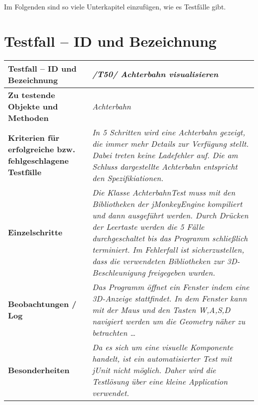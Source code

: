 Im Folgenden sind so viele Unterkapitel einzufügen, wie es Testfälle gibt.\\

\section{Testfall -- ID und Bezeichnung}


\begin{longtable}{|p{7cm}|p{10cm}|}
\hline
\textbf{Testfall -- ID und Bezeichnung} &  \textit{/T50/ Achterbahn visualisieren} \\
\hline
\textbf{Zu testende Objekte und Methoden} &  \textit{Achterbahn}
\\
\hline
\textbf{Kriterien für erfolgreiche bzw. fehlgeschlagene Testfälle} &
\textit{In 5 Schritten wird eine Achterbahn gezeigt, die immer mehr Details zur Verfügung stellt. Dabei treten keine Ladefehler auf. Die am Schluss dargestellte Achterbahn entspricht den Spezifikiationen. } \\
\hline
\textbf{Einzelschritte} &  \textit{ Die Klasse AchterbahnTest muss mit den Bibliotheken der jMonkeyEngine kompiliert und dann ausgeführt werden. Durch Drücken der Leertaste werden die 5 Fälle durchgeschaltet bis das 
Programm schließlich terminiert. Im Fehlerfall ist sicherzustellen, dass die verwendeten Bibliotheken zur 3D-Beschleunigung freigegeben wurden.
} \\
\hline
\textbf{Beobachtungen / Log} &  \textit{Das Programm öffnet ein Fenster indem eine 3D-Anzeige stattfindet. In dem Fenster kann mit der Maus und den Tasten W,A,S,D navigiert werden um die Geometry näher zu betrachten \ldots} \\
\hline
\textbf{Besonderheiten } &  \textit{Da es sich um eine visuelle Komponente handelt, ist ein automatisierter Test mit jUnit nicht möglich. Daher wird die Testlösung über eine kleine Application verwendet.} \\
\hline

 \end{longtable}






